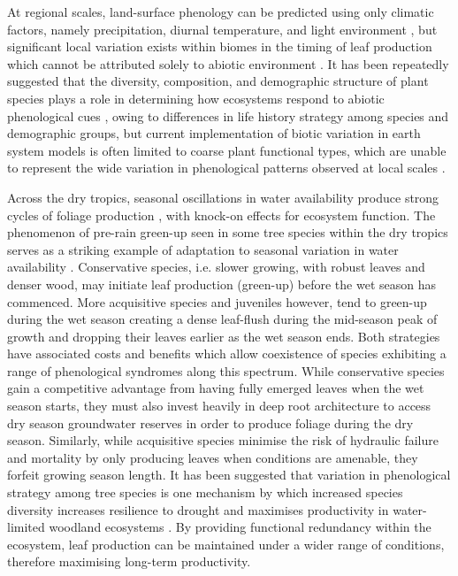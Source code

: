 \documentclass[11pt,a4paper]{article}
\begin{document}
At regional scales, land-surface phenology can be predicted using only climatic factors, namely precipitation, diurnal temperature, and light environment \citep{Adole2018a}, but significant local variation exists within biomes in the timing of leaf production which cannot be attributed solely to abiotic environment \citep{Stockli2011}. It has been repeatedly suggested that the diversity, composition, and demographic structure of plant species plays a role in determining how ecosystems respond to abiotic phenological cues \citep{Adole2018b, Jeganathan2014, Fuller1999}, owing to differences in life history strategy among species and demographic groups, but current implementation of biotic variation in earth system models is often limited to coarse plant functional types, which are unable to represent the wide variation in phenological patterns observed at local scales \citep{Scheiter2013, Pavlick2013}.

Across the dry tropics, seasonal oscillations in water availability produce strong cycles of foliage production \citep{Chidumayo2001, Dahlin2016}, with knock-on effects for ecosystem function. The phenomenon of pre-rain green-up seen in some tree species within the dry tropics serves as a striking example of adaptation to seasonal variation in water availability \citep{Ryan2017}. Conservative species, i.e. slower growing, with robust leaves and denser wood, may initiate leaf production (green-up) before the wet season has commenced. More acquisitive species and juveniles however, tend to green-up during the wet season creating a dense leaf-flush during the mid-season peak of growth and dropping their leaves earlier as the wet season ends. Both strategies have associated costs and benefits which allow coexistence of species exhibiting a range of phenological syndromes along this spectrum. While conservative species gain a competitive advantage from having fully emerged leaves when the wet season starts, they must also invest heavily in deep root architecture to access dry season groundwater reserves in order to produce foliage during the dry season. Similarly, while acquisitive species minimise the risk of hydraulic failure and mortality by only producing leaves when conditions are amenable, they forfeit growing season length. It has been suggested that variation in phenological strategy among tree species is one mechanism by which increased species diversity increases resilience to drought and maximises productivity in water-limited woodland ecosystems \citep{Stan2019, Morellato2016}. By providing functional redundancy within the ecosystem, leaf production can be maintained under a wider range of conditions, therefore maximising long-term productivity.
\end{document}
